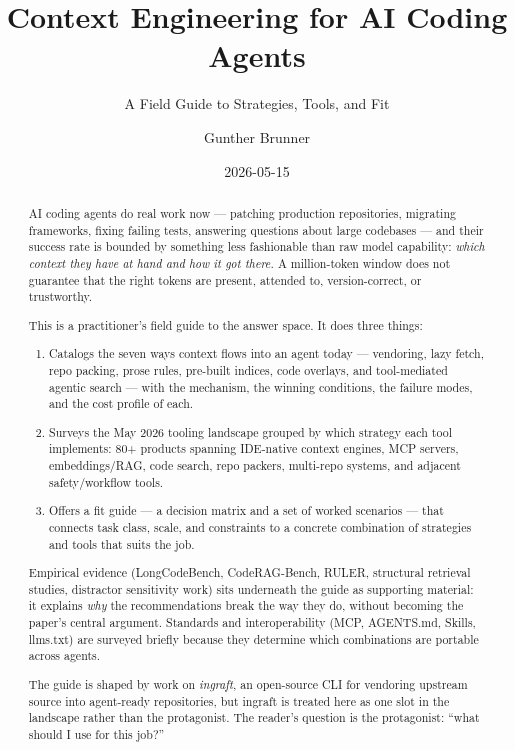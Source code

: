\documentclass[
  11pt,
  letterpaper,
  numbers=noendperiod,
  parskip=half]{scrartcl}
\title{Context Engineering for AI Coding Agents}
\subtitle{A Field Guide to Strategies, Tools, and Fit}
\author{Gunther Brunner}
\date{2026-05-15}
\providecommand{\tightlist}{%
  \setlength{\itemsep}{0pt}\setlength{\parskip}{0pt}}
\begin{document}
\maketitle
\begin{abstract}
AI coding agents do real work now --- patching production repositories,
migrating frameworks, fixing failing tests, answering questions about
large codebases --- and their success rate is bounded by something less
fashionable than raw model capability: \emph{which context they have at
hand and how it got there.} A million-token window does not guarantee
that the right tokens are present, attended to, version-correct, or
trustworthy.

This is a practitioner's field guide to the answer space. It does three
things:

\begin{enumerate}
\def\labelenumi{\arabic{enumi}.}
\tightlist
\item
  Catalogs the seven ways context flows into an agent today --- vendoring,
  lazy fetch, repo packing, prose rules, pre-built indices, code overlays,
  and tool-mediated agentic search --- with the mechanism, the winning
  conditions, the failure modes, and the cost profile of each.
\item
  Surveys the May 2026 tooling landscape grouped by which strategy each
  tool implements: 80+ products spanning IDE-native context engines, MCP
  servers, embeddings/RAG, code search, repo packers, multi-repo systems,
  and adjacent safety/workflow tools.
\item
  Offers a fit guide --- a decision matrix and a set of worked scenarios
  --- that connects task class, scale, and constraints to a concrete
  combination of strategies and tools that suits the job.
\end{enumerate}

Empirical evidence (LongCodeBench, CodeRAG-Bench, RULER, structural
retrieval studies, distractor sensitivity work) sits underneath the guide
as supporting material: it explains \emph{why} the recommendations break
the way they do, without becoming the paper's central argument. Standards
and interoperability (MCP, AGENTS.md, Skills, llms.txt) are surveyed
briefly because they determine which combinations are portable across
agents.

The guide is shaped by work on \emph{ingraft}, an open-source CLI for
vendoring upstream source into agent-ready repositories, but ingraft is
treated here as one slot in the landscape rather than the protagonist.
The reader's question is the protagonist: ``what should I use for this
job?''
\end{abstract}
\end{document}
